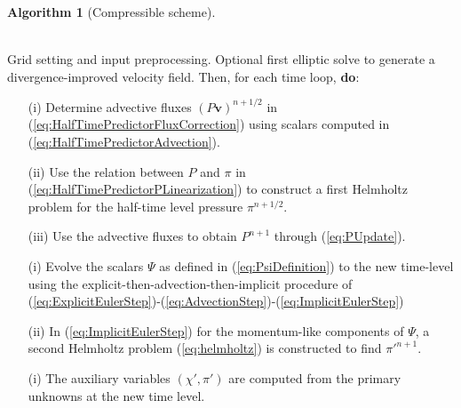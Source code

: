 \documentclass{ametsoc}
\theoremstyle{definition}
\newtheorem{algorithm}{Algorithm}
\newcommand{\eq}[1]{(\ref{#1})}
\newcommand{\vect}[1]{{\mathbf{#1}}}
\newcommand{\vv}{\vect{v}}
\newcommand{\piprime}{\pi'}
\newenvironment{falgorithm}
  {\begin{mdframed}\begin{algorithm}}
  {\end{algorithm}\end{mdframed}}
\begin{document}
\begin{falgorithm}[Compressible scheme]
\ \\
\begin{description}
%
\vspace{-2mm}

\item[\emph{Initialization}]\ \\ Grid setting and input preprocessing. Optional first elliptic solve to generate a divergence-improved velocity field. Then, for each time loop, \textbf{do}:
%
\item[\emph{First stage}]
%
  \begin{enumerate}\item[]
    \item[(i)] Determine advective fluxes $(P\vv)^{n+1/2}$ in \eq{eq:HalfTimePredictorFluxCorrection} using scalars computed in \eq{eq:HalfTimePredictorAdvection}.  

    \item[(ii)] Use the relation between $P$ and $\pi$ in \eq{eq:HalfTimePredictorPLinearization} to construct a first Helmholtz problem for the half-time level pressure $\pi^{n+1/2}$.

    \item[(iii)] Use the advective fluxes to obtain $P^{n+1}$ through \eq{eq:PUpdate}.

  \end{enumerate}

\item[\emph{Second stage - scalars update}]
%
  \begin{enumerate}\item[]
    \item[(i)] Evolve the scalars $\Psi$ as defined in \eq{eq:PsiDefinition} to the new time-level using the explicit-then-advection-then-implicit procedure of \eq{eq:ExplicitEulerStep}-\eq{eq:AdvectionStep}-\eq{eq:ImplicitEulerStep}

    \item[(ii)] In \eq{eq:ImplicitEulerStep} for the momentum-like components of $\Psi$, a second Helmholtz problem \eq{eq:helmholtz} is constructed to find $\pi'^{n+1}$.

  \end{enumerate}

\item[\emph{Auxiliary variables update}]

  \begin{enumerate}\item[]
    \item[(i)] The auxiliary variables $(\chi', \piprime)$ are computed from the primary unknowns at the new time level.
  \end{enumerate}

%
%
\end{description}
\end{falgorithm}
\end{document}

